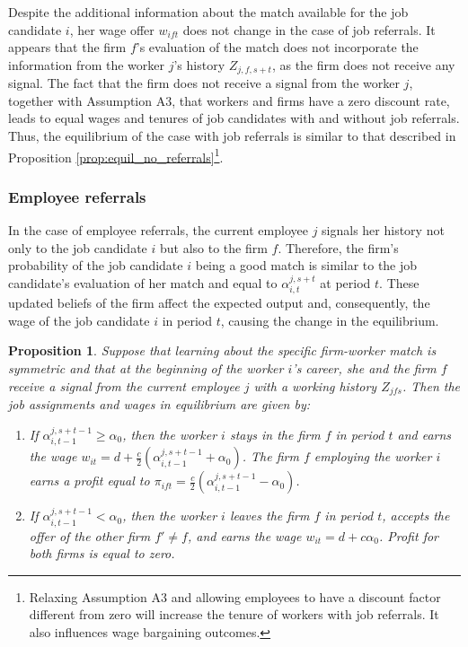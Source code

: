 \documentclass[12pt]{article}
\newtheorem{proposition}{Proposition}
\begin{document}
Despite the additional information about the match available for the job candidate $i$, her wage offer $w_{ift}$ does not change in the case of job referrals. It appears that the firm $f$'s evaluation of the match does not incorporate the information from the worker $j$’s history $Z_{j,f,s+t}$, as the firm does not receive any signal. The fact that the firm does not receive a signal from the worker $j$, together with Assumption A3, that workers and firms have a zero discount rate, leads to equal wages and tenures of job candidates with and without job referrals. Thus, the equilibrium of the case with job referrals is similar to that described in Proposition \ref{prop:equil_no_referrals}\footnote{Relaxing Assumption A3 and allowing employees to have a discount factor different from zero will increase the tenure of workers with job referrals. It also influences wage bargaining outcomes.}.

\subsubsection{Employee referrals}
In the case of employee referrals, the current employee $j$ signals her history not only to the job candidate $i$ but also to the firm $f$. Therefore, the firm's probability of the job candidate $i$ being a good match is similar to the job candidate's evaluation of her match and equal to $\alpha_{i,t}^{j,s+t}$ at period $t$. These updated beliefs of the firm affect the expected output and, consequently, the wage of the job candidate $i$ in period $t$, causing the change in the equilibrium.
\begin{proposition}\label{prop:equil_emp_referrals}
Suppose that learning about the specific firm-worker match is symmetric and that at the beginning of the worker $i$’s career, she and the firm $f$ receive a signal from the current employee $j$ with a working history $Z_{jfs}$. Then the job assignments and wages in equilibrium are given by:
\begin{enumerate}[label={\roman*})]
		\item If $\alpha_{i,t-1}^{j,s+t-1}\geq \alpha_0$, then the worker $i$ stays in the firm $f$ in period $t$ and earns the wage $w_{it}=d+\frac{c}{2}(\alpha_{i,t-1}^{j,s+t-1}+\alpha_{0})$. The firm $f$ employing the worker $i$ earns a profit equal to $\pi_{ift} = \frac{c}{2}(\alpha_{i,t-1}^{j,s+t-1}-\alpha_{0})$.
		\item If $\alpha_{i,t-1}^{j,s+t-1} < \alpha_0$, then the worker $i$ leaves the firm $f$ in period $t$, accepts the offer of the other firm $f'\neq f$, and earns the wage $w_{it}=d+c\alpha_0$. Profit for both firms is equal to zero.
\end{enumerate}
\end{proposition}
\end{document}
